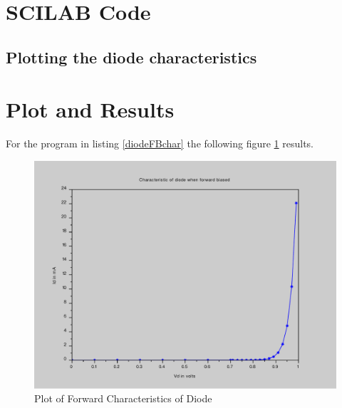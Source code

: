 \section*{SCILAB Code}
\subsection*{Plotting the diode characteristics}





\section*{Plot and Results}

For the program in listing \ref{diodeFBchar} the following figure \ref{diodeFBcharFig} results.

\begin{figure}
\includegraphics[width=\textwidth]{scilabCode/diodeFBchar.pdf}
\caption{Plot of Forward Characteristics of Diode}
\label{diodeFBcharFig}
\end{figure}
